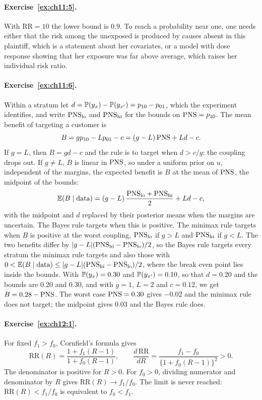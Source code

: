 \paragraph{Exercise~\ref{ex:ch11:5}.} With $\mathrm{RR} = 10$ the lower bound is $0.9$. To reach a probability near one, one needs either that the risk among the unexposed is produced by causes absent in this plaintiff, which is a statement about her covariates, or a model with dose response showing that her exposure was far above average, which raises her individual risk ratio.

\paragraph{Exercise~\ref{ex:ch11:6}.} Within a stratum let $d = \mathbb{P}(y_x) - \mathbb{P}(y_{x'}) = p_{10} - p_{01}$, which the experiment identifies, and write $\mathrm{PNS}_{\mathrm{lo}}$ and $\mathrm{PNS}_{\mathrm{hi}}$ for the bounds on $\mathrm{PNS} = p_{10}$. The mean benefit of targeting a customer is
\[
B = g p_{10} - L p_{01} - c = (g - L)\,\mathrm{PNS} + L d - c.
\]
If $g = L$, then $B = g d - c$ and the rule is to target when $d > c/g$: the coupling drops out. If $g \neq L$, $B$ is linear in $\mathrm{PNS}$, so under a uniform prior on $u$, independent of the margins, the expected benefit is $B$ at the mean of $\mathrm{PNS}$, the midpoint of the bounds:
\[
\mathbb{E}(B \mid \text{data}) = (g - L)\,\frac{\mathrm{PNS}_{\mathrm{lo}} + \mathrm{PNS}_{\mathrm{hi}}}{2} + L d - c,
\]
with the midpoint and $d$ replaced by their posterior means when the margins are uncertain. The Bayes rule targets when this is positive. The minimax rule targets when $B$ is positive at the worst coupling, $\mathrm{PNS}_{\mathrm{lo}}$ if $g > L$ and $\mathrm{PNS}_{\mathrm{hi}}$ if $g < L$. The two benefits differ by $|g - L|(\mathrm{PNS}_{\mathrm{hi}} - \mathrm{PNS}_{\mathrm{lo}})/2$, so the Bayes rule targets every stratum the minimax rule targets and also those with $0 < \mathbb{E}(B \mid \text{data}) \leq |g - L|(\mathrm{PNS}_{\mathrm{hi}} - \mathrm{PNS}_{\mathrm{lo}})/2$, where the break even point lies inside the bounds. With $\mathbb{P}(y_x) = 0.30$ and $\mathbb{P}(y_{x'}) = 0.10$, so that $d = 0.20$ and the bounds are 0.20 and 0.30, and with $g = 1$, $L = 2$ and $c = 0.12$, we get $B = 0.28 - \mathrm{PNS}$. The worst case $\mathrm{PNS} = 0.30$ gives $-0.02$ and the minimax rule does not target; the midpoint gives $0.03$ and the Bayes rule does.

\paragraph{Exercise~\ref{ex:ch12:1}.} For fixed $f_1 > f_0$, Cornfield's formula gives
\[
\mathrm{RR}(R) = \frac{1 + f_1(R - 1)}{1 + f_0(R - 1)}, \qquad
\frac{d\,\mathrm{RR}}{dR} = \frac{f_1 - f_0}{\{1 + f_0(R - 1)\}^2} > 0.
\]
The denominator is positive for $R > 0$. For $f_0 > 0$, dividing numerator and denominator by $R$ gives $\mathrm{RR}(R) \to f_1/f_0$. The limit is never reached: $\mathrm{RR}(R) < f_1/f_0$ is equivalent to $f_0 < f_1$.

